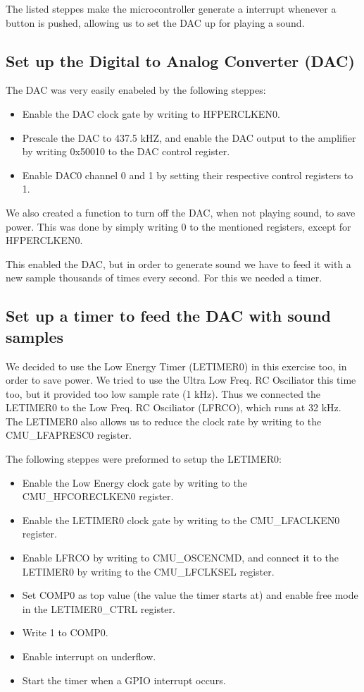 The listed steppes make the microcontroller generate a interrupt whenever a button is pushed, allowing us to set the DAC up for playing a sound. 

\subsection{Set up the Digital to Analog Converter (DAC)}

The DAC was very easily enabeled by the following steppes\cite{compendium}:

\begin{itemize}
	\item Enable the DAC clock gate by writing to HFPERCLKEN0. 
	\item Prescale the DAC to 437.5 kHZ, and enable the DAC output to the amplifier by writing 0x50010 to the DAC control register.
	\item Enable DAC0 channel 0 and 1 by setting their respective control registers to 1.  
\end{itemize}

We also created a function to turn off the DAC, when not playing sound, to save power. This was done by simply writing 0 to the mentioned registers, except for HFPERCLKEN0.

This enabled the DAC, but in order to generate sound we have to feed it with a new sample thousands of times every second. For this we needed a timer.

\subsection{Set up a timer to feed the DAC with sound samples}

We decided to use the Low Energy Timer (LETIMER0) in this exercise too, in order to save power. We tried to use the 
Ultra Low Freq. RC Osciliator this time too, but it provided too low sample rate (1 kHz). Thus we connected the LETIMER0 to the Low Freq. RC Osciliator (LFRCO), which runs at 32 kHz. The LETIMER0 also allows us to reduce the clock rate by
writing to the CMU\_LFAPRESC0 register.

The following steppes were preformed to setup the LETIMER0:

\begin{itemize}
	\item Enable the Low Energy clock gate by writing to the CMU\_HFCORECLKEN0 register.
	\item Enable the LETIMER0 clock gate by writing to the CMU\_LFACLKEN0 register. 
	\item  Enable LFRCO by writing to CMU\_OSCENCMD, and connect it to the LETIMER0 by writing
	to the CMU\_LFCLKSEL register. 
	\item Set COMP0 as top value (the value the timer starts at) and enable free mode in the LETIMER0\_CTRL register.
	\item Write 1 to COMP0. 
	\item Enable interrupt on underflow.  
	\item Start the timer when a GPIO interrupt occurs. 
\end{itemize}

